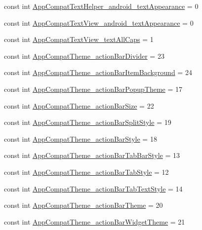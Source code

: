 \begin{CompactItemize}
\item 
const int \hyperlink{class__2doo_1_1_droid_1_1_resource_1_1_styleable_5282684e786d1d7ba556db5858b32772}{AppCompatTextHelper\_\-android\_\-textAppearance} = 0
\item 
const int \hyperlink{class__2doo_1_1_droid_1_1_resource_1_1_styleable_69fc84bb07f5413dcfc3cc68033c90c9}{AppCompatTextView\_\-android\_\-textAppearance} = 0
\item 
const int \hyperlink{class__2doo_1_1_droid_1_1_resource_1_1_styleable_01f5aa86548d8d16b26e6d981ea45c47}{AppCompatTextView\_\-textAllCaps} = 1
\item 
const int \hyperlink{class__2doo_1_1_droid_1_1_resource_1_1_styleable_d425b4196b3f673f5fe7a60c72ed7242}{AppCompatTheme\_\-actionBarDivider} = 23
\item 
const int \hyperlink{class__2doo_1_1_droid_1_1_resource_1_1_styleable_98dcf78a25c83a32b81b3f2705988b99}{AppCompatTheme\_\-actionBarItemBackground} = 24
\item 
const int \hyperlink{class__2doo_1_1_droid_1_1_resource_1_1_styleable_3810b08df2c27b269b321b3eb012a266}{AppCompatTheme\_\-actionBarPopupTheme} = 17
\item 
const int \hyperlink{class__2doo_1_1_droid_1_1_resource_1_1_styleable_ccfbc4290fd7e5bc4fb3f5a720b670a2}{AppCompatTheme\_\-actionBarSize} = 22
\item 
const int \hyperlink{class__2doo_1_1_droid_1_1_resource_1_1_styleable_4d0480fdbec9b0f7943279e47bc1aae0}{AppCompatTheme\_\-actionBarSplitStyle} = 19
\item 
const int \hyperlink{class__2doo_1_1_droid_1_1_resource_1_1_styleable_b8229af9a8234bcdc784e9bae5f62f58}{AppCompatTheme\_\-actionBarStyle} = 18
\item 
const int \hyperlink{class__2doo_1_1_droid_1_1_resource_1_1_styleable_9975f759a58cb063ec703e27fe495b1f}{AppCompatTheme\_\-actionBarTabBarStyle} = 13
\item 
const int \hyperlink{class__2doo_1_1_droid_1_1_resource_1_1_styleable_964345c4c4ae547fab226379822b0751}{AppCompatTheme\_\-actionBarTabStyle} = 12
\item 
const int \hyperlink{class__2doo_1_1_droid_1_1_resource_1_1_styleable_dc91c2a20912f7582712aa145d04496e}{AppCompatTheme\_\-actionBarTabTextStyle} = 14
\item 
const int \hyperlink{class__2doo_1_1_droid_1_1_resource_1_1_styleable_8dd3c726d31185bf82c2ce7e54b434e5}{AppCompatTheme\_\-actionBarTheme} = 20
\item 
const int \hyperlink{class__2doo_1_1_droid_1_1_resource_1_1_styleable_7e973e8071b3a4f5becbc3a2874acafb}{AppCompatTheme\_\-actionBarWidgetTheme} = 21

\end{CompactItemize}
